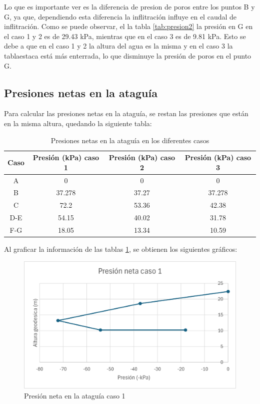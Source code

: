\documentclass{article}
\begin{document}
    
Lo que es importante ver es la diferencia de presion de poros entre los puntos B y G, ya que, dependiendo esta diferencia la inflitración influye en el caudal de inflitración. Como se puede observar, el la tabla \ref{tab:presion2} la presión en G en el caso 1 y 2 es de 29.43 kPa, mientras que en el caso 3 es de 9.81 kPa. Esto se debe a que en el caso 1 y 2 la altura del agua es la misma y en el caso 3 la tablaestaca está más enterrada, lo que disminuye la presión de poros en el punto G.



\subsection{Presiones netas en la ataguía}
Para calcular las presiones netas en la ataguía, se restan las presiones que están en la misma altura, quedando la siguiente tabla:

\begin{table}[h!]
  \centering
  \begin{tabular}{cccc}
    \hline
    \textbf{Caso} & \textbf{Presión (kPa) caso 1} & \textbf{Presión (kPa) caso 2} & \textbf{Presión (kPa) caso 3} \\ \hline
    A   & 0      & 0      & 0      \\ 
    B   & 37.278 & 37.27  & 37.278 \\ 
    C   & 72.2   & 53.36  & 42.38  \\ 
    D-E & 54.15  & 40.02  & 31.78  \\ 
    F-G & 18.05  & 13.34  & 10.59  \\ \hline
  \end{tabular}
  \caption{Presiones netas en la ataguía en los diferentes casos}
  \label{tab:presion_neta1}
\end{table}



Al graficar la información de las tablas \ref{tab:presion_neta1}, se obtienen los siguientes gráficos:


\begin{figure}[h!]
  \centering
  \includegraphics[width=0.55\linewidth]{graficos/grafico_presiones_1.png}
  \caption{Presión neta en la ataguía caso 1}
  \label{fig:presion_neta1}
\end{figure}
\end{document}
